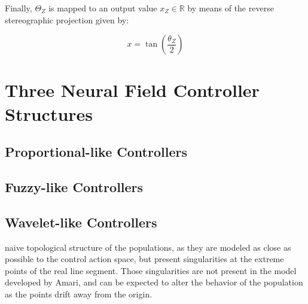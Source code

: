 Finally, $\Theta_Z$ is mapped to an output value $x_Z \in \mathbb{R}$
by means of the reverse stereographic projection given by:

\begin{equation}
  \label{eq:eqn-outval}
  x=\tan(\frac{\theta_Z}{2})
\end{equation}



\section{Three Neural Field Controller Structures}
\label{sec:control-struc}

\subsection{Proportional-like Controllers}
\label{sec:prop-control}


\subsection{Fuzzy-like Controllers}
\label{sec:fuzzy-control}


\subsection{Wavelet-like Controllers}
\label{sec:wavelet-control}






naive topological
structure of the populations, as they are modeled as close as possible
to the control action space, but present singularities at the extreme
points of the real line segment. Those singularities are not present
in the model developed by Amari, and can be expected to alter the
behavior of the population as the points drift away from the origin.

